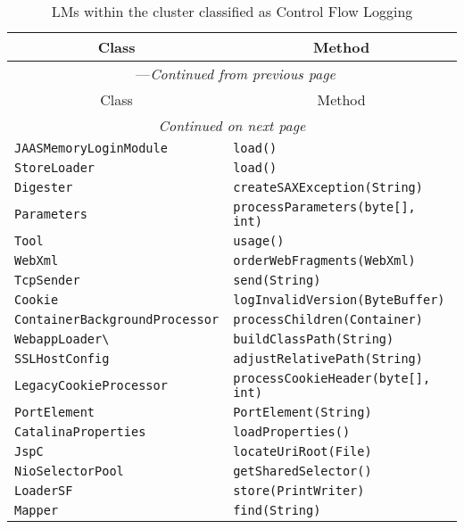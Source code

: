 \begin{center}
\begin{longtable}{ll}
\caption{LMs within the cluster classified as Control Flow Logging}\\
\toprule\multicolumn{1}{c}{Class}&\multicolumn{1}{c}{Method}\\\midrule
\endfirsthead

\multicolumn{2}{c}{\tablename\ \thetable{}---\textit{Continued from previous page}} \\\midrule
\multicolumn{1}{c}{Class}&\multicolumn{1}{c}{Method}\\\midrule
\endhead
\multicolumn{2}{c}{\textit{Continued on next page}}\\\midrule
\endfoot
\bottomrule
\endlastfoot

\lstinline/JAASMemoryLoginModule/&{\lstinline/load()/}\\
\lstinline/StoreLoader/&{\lstinline/load()/}\\
\lstinline/Digester/&{\lstinline/createSAXException(String)/}\\
\lstinline/Parameters/&{\lstinline/processParameters(byte[], int)/}\\
\lstinline/Tool/&{\lstinline/usage()/}\\
\lstinline/WebXml/&{\lstinline/orderWebFragments(WebXml)/}\\
\lstinline/TcpSender/&{\lstinline/send(String)/}\\
\lstinline/Cookie/&{\lstinline/logInvalidVersion(ByteBuffer)/}\\
\lstinline/ContainerBackgroundProcessor/&{\lstinline/processChildren(Container)/}\\
\lstinline/WebappLoader\/&{\lstinline/buildClassPath(String)/}\\
\lstinline/SSLHostConfig/&{\lstinline/adjustRelativePath(String)/}\\
\lstinline/LegacyCookieProcessor/&{\lstinline/processCookieHeader(byte[], int)/}\\
\lstinline/PortElement/&{\lstinline/PortElement(String)/}\\
\lstinline/CatalinaProperties/&{\lstinline/loadProperties()/}\\
\lstinline/JspC/&{\lstinline/locateUriRoot(File)/}\\
\lstinline/NioSelectorPool/&{\lstinline/getSharedSelector()/}\\
\lstinline/LoaderSF/&{\lstinline/store(PrintWriter)/}\\
\lstinline/Mapper/&{\lstinline/find(String)/}\\

\end{longtable}
\end{center}

